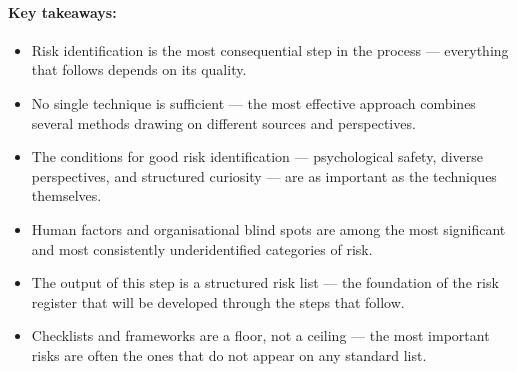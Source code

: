 \paragraph{Key takeaways:}
\begin{itemize}
  \item{Risk identification is the most consequential step in the process — everything that follows depends on its quality.}
  \item{No single technique is sufficient — the most effective approach combines several methods drawing on different sources and perspectives.}
  \item{The conditions for good risk identification — psychological safety, diverse perspectives, and structured curiosity — are as important as the techniques themselves.}
  \item{Human factors and organisational blind spots are among the most significant and most consistently underidentified categories of risk.}
  \item{The output of this step is a structured risk list — the foundation of the risk register that will be developed through the steps that follow.}
  \item{Checklists and frameworks are a floor, not a ceiling — the most important risks are often the ones that do not appear on any standard list.}
\end{itemize}

